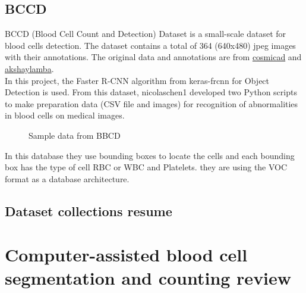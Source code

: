 \subsection{BCCD}
\hspace{\parindent}
BCCD (Blood Cell Count and Detection) Dataset is a small-scale dataset for blood cells detection. The dataset contains a total of 364 (640x480) jpeg images with their annotations. The original data and annotations are from \href{https://github.com/cosmicad/dataset}{cosmicad} and \href{https://github.com/akshaylamba/all_CELL_data}{akshaylamba}.\\
In this project, the Faster R-CNN algorithm from keras-frcnn for Object Detection is used. From this dataset, nicolaschen1 developed two Python scripts to make preparation data (CSV file and images) for recognition of abnormalities in blood cells on medical images.

\begin{figure}[H]
\centering
\caption{Sample data from BBCD}
\label{fig:BBCD1}
\end{figure}

In this database they use bounding boxes to locate the cells and each bounding box has the type of cell RBC or WBC and Platelets. they are using the VOC format as a database architecture.

\subsection{Dataset collections resume}
\hspace{\parindent}



\section{Computer-assisted blood cell segmentation and counting review}

